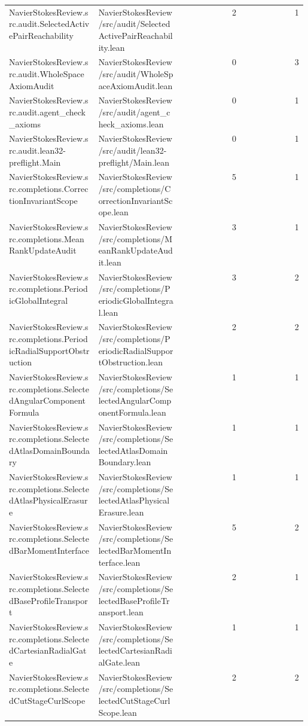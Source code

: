 \begin{longtable}{p{0.30\linewidth}p{0.28\linewidth}rr}
NavierStokesReview.src.audit.SelectedActivePairReachability & NavierStokesReview/src/audit/SelectedActivePairReachability.lean & 2 & 1\\
NavierStokesReview.src.audit.WholeSpaceAxiomAudit & NavierStokesReview/src/audit/WholeSpaceAxiomAudit.lean & 0 & 3\\
NavierStokesReview.src.audit.agent\_check\_axioms & NavierStokesReview/src/audit/agent\_check\_axioms.lean & 0 & 1\\
NavierStokesReview.src.audit.lean32-preflight.Main & NavierStokesReview/src/audit/lean32-preflight/Main.lean & 0 & 1\\
NavierStokesReview.src.completions.CorrectionInvariantScope & NavierStokesReview/src/completions/CorrectionInvariantScope.lean & 5 & 1\\
NavierStokesReview.src.completions.MeanRankUpdateAudit & NavierStokesReview/src/completions/MeanRankUpdateAudit.lean & 3 & 1\\
NavierStokesReview.src.completions.PeriodicGlobalIntegral & NavierStokesReview/src/completions/PeriodicGlobalIntegral.lean & 3 & 2\\
NavierStokesReview.src.completions.PeriodicRadialSupportObstruction & NavierStokesReview/src/completions/PeriodicRadialSupportObstruction.lean & 2 & 2\\
NavierStokesReview.src.completions.SelectedAngularComponentFormula & NavierStokesReview/src/completions/SelectedAngularComponentFormula.lean & 1 & 1\\
NavierStokesReview.src.completions.SelectedAtlasDomainBoundary & NavierStokesReview/src/completions/SelectedAtlasDomainBoundary.lean & 1 & 1\\
NavierStokesReview.src.completions.SelectedAtlasPhysicalErasure & NavierStokesReview/src/completions/SelectedAtlasPhysicalErasure.lean & 1 & 1\\
NavierStokesReview.src.completions.SelectedBarMomentInterface & NavierStokesReview/src/completions/SelectedBarMomentInterface.lean & 5 & 2\\
NavierStokesReview.src.completions.SelectedBaseProfileTransport & NavierStokesReview/src/completions/SelectedBaseProfileTransport.lean & 2 & 1\\
NavierStokesReview.src.completions.SelectedCartesianRadialGate & NavierStokesReview/src/completions/SelectedCartesianRadialGate.lean & 1 & 1\\
NavierStokesReview.src.completions.SelectedCutStageCurlScope & NavierStokesReview/src/completions/SelectedCutStageCurlScope.lean & 2 & 2\\

\end{longtable}
